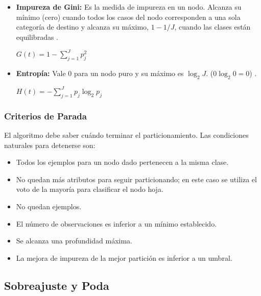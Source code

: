 \documentclass[twoside,a4paper,12pt,onecolumn,openany]{book}
\begin{document}
\begin{itemize}
    \item \textbf{Impureza de Gini:}  Es la medida de impureza en un nodo. Alcanza su mínimo (cero) cuando todos los casos del nodo corresponden a una sola categoría de destino  y alcanza su máximo, $1-1/J$, cuando las clases están equilibradas \cite{guion_arboles2024}.

     $G(t)=1-\sum_{j=1}^{J}p_j^2$
     
    \item \textbf{Entropía:} Vale $0$ para un nodo puro y su máximo es $\log_2 J$. ($0\log_2 0=0$) \cite{guion_arboles2024}.

    $H(t)=-\sum_{j=1}^{J}p_j\log_2 p_j$

\end{itemize}

\subsubsection{Criterios de Parada}

  El algoritmo debe saber cuándo terminar el particionamiento. Las condiciones naturales para detenerse son:

  \begin{itemize}
    \item Todos los ejemplos para un nodo dado pertenecen a la misma clase. 
    
    \item No quedan más atributos para seguir particionando; en este caso se utiliza el voto de la mayoría para clasificar el nodo hoja. 

    \item No quedan ejemplos.

    \item El número de observaciones es inferior a un mínimo establecido.

    \item Se alcanza una profundidad máxima.

    \item La mejora de impureza de la mejor partición es inferior a un umbral.

\end{itemize}

\subsection{Sobreajuste y Poda}
\end{document}
